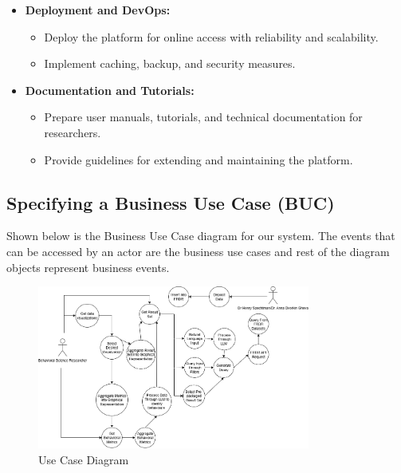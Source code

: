 \documentclass[12pt]{article}
\begin{document}
\begin{itemize}
    \item \textbf{Deployment and DevOps:} 
        \begin{itemize}
            \item Deploy the platform for online access with reliability and scalability.
            \item Implement caching, backup, and security measures.
        \end{itemize}
        
    \item \textbf{Documentation and Tutorials:} 
        \begin{itemize}
            \item Prepare user manuals, tutorials, and technical documentation for researchers.
            \item Provide guidelines for extending and maintaining the platform.
        \end{itemize}
\end{itemize}



\subsection{Specifying a Business Use Case (BUC)}

\par{ Shown below is the Business Use Case diagram for our system. The
events that can be accessed by an actor are the business use cases and rest of the
diagram objects represent business events.\newline\newline}

\begin{figure}[H]
    \centering
    \includegraphics[width=0.8\textwidth]{6.4 Use Case Diagram.png}
    \caption{Use Case Diagram}
    \label{fig:myimage}
\end{figure}
\end{document}
